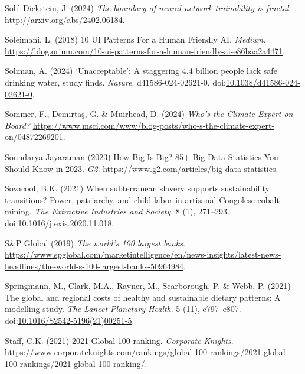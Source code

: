 \documentclass[
  letterpaper,
  DIV=11,
  numbers=noendperiod]{scrartcl}
\newlength{\cslhangindent}
\newenvironment{CSLReferences}[2] %
 {\begin{list}{}{%
  \setlength{\itemindent}{0pt}
  \setlength{\leftmargin}{0pt}
  \setlength{\parsep}{0pt}
  \ifodd #1
   \setlength{\leftmargin}{\cslhangindent}
   \setlength{\itemindent}{-1\cslhangindent}
  \fi
  \setlength{\itemsep}{#2\baselineskip}}}
 {\end{list}}
\begin{document}
\begin{CSLReferences}{0}{1}
Sohl-Dickstein, J. (2024) \emph{The boundary of neural network
trainability is fractal}. \url{http://arxiv.org/abs/2402.06184}.

Soleimani, L. (2018) 10 {UI Patterns For} a {Human Friendly AI}.
\emph{Medium}.
\url{https://blog.orium.com/10-ui-patterns-for-a-human-friendly-ai-e86baa2a4471}.

Soliman, A. (2024) {`{Unacceptable}'}: A staggering 4.4 billion people
lack safe drinking water, study finds. \emph{Nature}.
d41586-024-02621-0.
doi:\href{https://doi.org/10.1038/d41586-024-02621-0}{10.1038/d41586-024-02621-0}.

Sommer, F., Demirtaş, G. \& Muirhead, D. (2024) \emph{Who's the {Climate
Expert} on {Board}?}
\url{https://www.msci.com/www/blog-posts/who-s-the-climate-expert-on/04872269201}.

Soundarya Jayaraman (2023) How {Big Is Big}? 85+ {Big Data Statistics
You Should Know} in 2023. \emph{G2}.
\url{https://www.g2.com/articles/big-data-statistics}.

Sovacool, B.K. (2021) When subterranean slavery supports sustainability
transitions? Power, patriarchy, and child labor in artisanal {Congolese}
cobalt mining. \emph{The Extractive Industries and Society}. 8 (1),
271--293.
doi:\href{https://doi.org/10.1016/j.exis.2020.11.018}{10.1016/j.exis.2020.11.018}.

S\&P Global (2019) \emph{The world's 100 largest banks}.
\url{https://www.spglobal.com/marketintelligence/en/news-insights/latest-news-headlines/the-world-s-100-largest-banks-50964984}.

Springmann, M., Clark, M.A., Rayner, M., Scarborough, P. \& Webb, P.
(2021) The global and regional costs of healthy and sustainable dietary
patterns: A modelling study. \emph{The Lancet Planetary Health}. 5 (11),
e797--e807.
doi:\href{https://doi.org/10.1016/S2542-5196(21)00251-5}{10.1016/S2542-5196(21)00251-5}.

Staff, C.K. (2021) 2021 {Global} 100 ranking. \emph{Corporate Knights}.
\url{https://www.corporateknights.com/rankings/global-100-rankings/2021-global-100-rankings/2021-global-100-ranking/}.


\end{CSLReferences}
\end{document}
